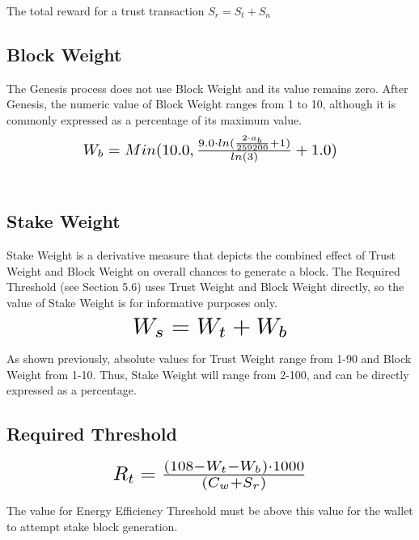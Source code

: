 \documentclass[11pt]{article}
\begin{document}
\noindent The total reward for a trust transaction $S_{r} = S_{t} + S_{n}$\\


\subsection{Block Weight}
The Genesis process does not use Block Weight and its value remains zero. After Genesis, the numeric value of Block Weight ranges from 1 to 10, although it is commonly expressed as a percentage of its maximum value.\\

\begin{equation}
\resizebox{.65\hsize}{!}{$W_{b} = Min(10.0, \frac{9.0 \cdot ln(\frac{2 \cdot a_{b}}{259200} + 1)}{ln(3)} + 1.0)$}
\end{equation}\\


\subsection{Stake Weight}
Stake Weight is a derivative measure that depicts the combined effect of Trust Weight and Block Weight on overall chances to generate a block. The Required Threshold (see Section 5.6) uses Trust Weight and Block Weight directly, so the value of Stake Weight is for informative purposes only.\\

\begin{equation}
\resizebox{.40\hsize}{!}{$W_{s} = W_{t} + W_{b}$}
\end{equation}

\noindent As shown previously, absolute values for Trust Weight range from 1-90 and Block Weight from 1-10. Thus, Stake Weight will range from 2-100, and can be directly expressed as a percentage.\\


\subsection{Required Threshold}

\begin{equation}
\resizebox{.5\hsize}{!}{$R_{t} = \frac{(108 - W_{t} - W_{b}) \cdot 1000}{(C_{w} + S_{r})}$}
\end{equation}


\noindent The value for Energy Efficiency Threshold must be above this value for the wallet to attempt stake block generation.\\
\end{document}
